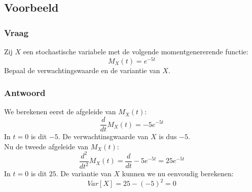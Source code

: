 \documentclass[main.tex]{subfiles}
\begin{document}
\subsection*{Voorbeeld}
\subsubsection*{Vraag}
Zij $X$ een stochastische variabele met de volgende momentgenererende functie:
\[ M_{X}(t) = e^{-5t} \]
Bepaal de verwachtingswaarde en de variantie van $X$.

\subsubsection*{Antwoord}
We berekenen eerst de afgeleide van $M_{X}(t)$:
\[ \frac{d}{dt}M_{X}(t) = -5e^{-5t} \]
In $t=0$ is dit $-5$.
De verwachtinsgwaarde van $X$ is dus $-5$.\\
Nu de tweede afgeleide van $M_{X}(t)$:
\[ \frac{d^{2}}{dt^{2}}M_{X}(t) = \frac{d}{dt} -5e^{-5t} = 25e^{-5t} \]
In $t=0$ is dit $25$.
De variantie van $X$ kunnen we nu eenvoudig berekenen:
\[ Var[X] = 25 - (-5)^{2} = 0 \]
\end{document}
